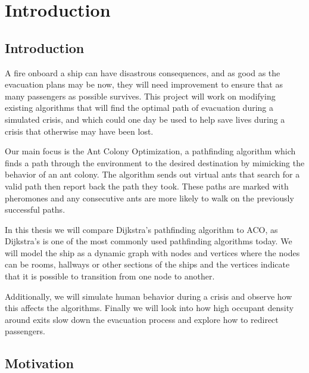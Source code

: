 \chapter{Introduction}
\label{ch:introduction}

\section{Introduction}

A fire onboard a ship can have disastrous consequences, and as good as the evacuation plans may be now,                           
they will need improvement to ensure that as many passengers as possible survives. This project will work                           
 on modifying existing algorithms that will find the optimal path of evacuation during a simulated crisis, and which could         
 one day be used to help save lives during a crisis that otherwise may have been lost. 

Our main focus is the Ant Colony Optimization, a pathfinding algorithm which finds a path through
 the environment to the desired destination by mimicking the behavior of an ant colony. The algorithm sends    
out virtual ants that search for a valid path then report back the path they took.            
These paths are marked with pheromones and any consecutive ants are more likely to walk on the previously successful paths.

In this thesis we will compare Dijkstra's pathfinding algorithm to ACO, as Dijkstra's is one of the most commonly
 used pathfinding algorithms today. We will model the ship as a dynamic graph with nodes and vertices where
 the nodes can be rooms, hallways or other sections of the ships and the vertices indicate that it is possible to
 transition from one node to another. 

Additionally, we will simulate human behavior during a crisis and observe
 how this affects the algorithms. Finally we will look into how high occupant density around exits slow down the 
evacuation process and explore how to redirect passengers.

\section{Motivation}

